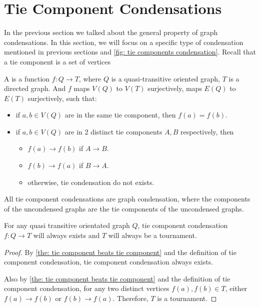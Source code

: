 \section{Tie Component Condensations}

In the previous section we talked about the general property
of graph condensations.
In this section, we will focus on a specific type of condensation
mentioned in previous sections and
\cref{fig: tie components condensation}.
Recall that a tie component is a set of vertices

\begin{definition}
  A  is a
  function \(f: Q \to T\),
  where \(Q\) is a quasi-transitive oriented graph,
  \(T\) is a directed graph.
  And \(f\) maps \(V(Q)\) to \(V(T)\) surjectively,
  maps \(E(Q)\) to \(E(T)\) surjectively,
  such that:
  \begin{itemize}
    \item if \(a, b \in V(Q)\) are in the same tie component,
      then \(f(a) = f(b)\).
    \item if \(a, b \in V(Q)\) are in 2 distinct tie components
      \(A, B\) respectively,
      then
      \begin{itemize}
        \item \(f(a) \to f(b)\) if \(A \to B\).
        \item \(f(b) \to f(a)\) if \(B \to A\).
        \item otherwise, tie condensation do not exists.
      \end{itemize}
  \end{itemize}
\end{definition}

\begin{corollary}\label{the: tie condensation are condensation}
  All tie component condensations are graph condensation,
  where the components of the uncondensed graphs
  are the tie components of the uncondensed graphs.
\end{corollary}

\begin{corollary}\label{the: tie condensation results in tournament}
  For any quasi transitive orientated graph \(Q\),
  tie component condensation \(f: Q \to T\) will always exists
  and \(T\) will always be a tournament.
\end{corollary}
\begin{proof}
  By \cref{the: tie component beats tie component} and
  the definition of tie component condensation,
  tie component condensation always exists.

  Also by \cref{the: tie component beats tie component} and
  the definition of tie component condensation,
  for any two distinct vertices \(f(a), f(b) \in T\),
  either \(f(a) \to f(b)\) or \(f(b) \to f(a)\).
  Therefore, \(T\) is a tournament.
\end{proof}

